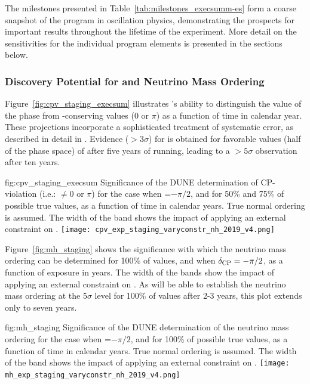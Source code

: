 The milestones presented in Table~\ref{tab:milestones_execsumm-es} 
form a coarse snapshot of the  program in oscillation physics, 
demonstrating the prospects for important results throughout 
the lifetime of the experiment.  More detail on the 
sensitivities for the individual program elements
is presented in the sections below.

\subsubsection{Discovery Potential for  and Neutrino 
Mass Ordering}

Figure~\ref{fig:cpv_staging_execsum} 
illustrates 's ability to distinguish 
the value of the  phase \deltacp from -conserving 
values (0 or $\pi$) as a function of time in calendar year.  
These projections incorporate a sophisticated treatment of systematic 
error, as described in detail in \physchlbl.  
Evidence ($>3\sigma$) for  is obtained for 
favorable values (half of the phase space) of \deltacp after five 
years of running, leading to a $>5\sigma$ %
observation after ten years.

\begin{dunefigure}{fig:cpv_staging_execsum}
{Significance of the DUNE determination of CP-violation (i.e.: \deltacp 
$\neq 0$ or $\pi$) for the case when \deltacp=$-\pi/2$, and for 50\% and 
75\% of possible true \deltacp values, as a function of time in calendar 
years. True normal ordering is assumed. The width of the band shows the 
impact of applying an external constraint on .}
\texttt{[image: cpv\_exp\_staging\_varyconstr\_nh\_2019\_v4.png]}
\end{dunefigure}

Figure~\ref{fig:mh_staging} shows the significance
with which the neutrino mass ordering can be determined for 100\% of \deltacp values, and when $\delta_{\rm CP}=-\pi/2$, as a function of exposure in years. The width of the bands show the impact of applying an external constraint on . As  will be able to establish the neutrino mass ordering at the 5$\sigma$ level for 100\% of \deltacp values after 2-3 years, this plot extends only to seven years.

\begin{dunefigure}
{fig:mh_staging}
{Significance of the DUNE determination of the neutrino mass ordering for the case when \deltacp=$-\pi/2$, and for 100\% of possible true \deltacp values, as a function of time in calendar years. True normal ordering is assumed. The width of the band shows the impact of applying an external constraint on .}
	\texttt{[image: mh\_exp\_staging\_varyconstr\_nh\_2019\_v4.png]}	
\end{dunefigure}


